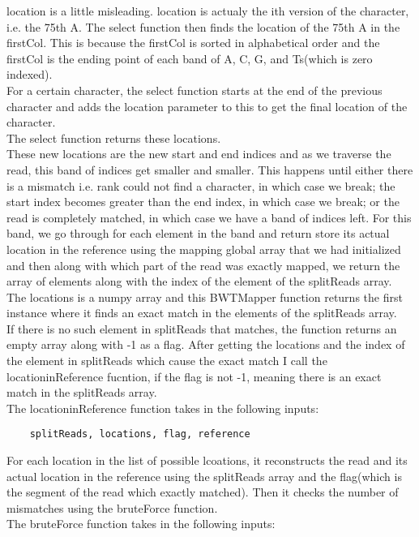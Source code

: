 \documentclass[12pt]{article}
\begin{document}
location is a little misleading. location is actualy the ith version of the character, i.e. the 75th A. The select function then finds the location of the 75th A in the firstCol. This is because the firstCol is sorted in alphabetical order and the firstCol is the ending point of each band of A, C, G, and Ts(which is zero indexed).\\
For a certain character, the select function starts at the end of the previous character and adds the location parameter to this to get the final location of the character.\\
The select function returns these locations.\\
These new locations are the new start and end indices and as we traverse the read, this band of indices get smaller and smaller. This happens until either there is a mismatch i.e. rank could not find a character, in which case we break; the start index becomes greater than the end index, in which case we break; or the read is completely matched, in which case we have a band of indices left. For this band, we go through for each element in the band and return store its actual location in the reference using the mapping global array that we had initialized and then along with which part of the read was exactly mapped, we return the array of elements along with the index of the element of the splitReads array.\\
The locations is a numpy array and this BWTMapper function returns the first instance where it finds an exact match in the elements of the splitReads array.\\
If there is no such element in splitReads that matches, the function returns an empty array along with -1 as a flag.
After getting the locations and the index of the element in splitReads which cause the exact match I call the locationinReference fucntion, if the flag is not -1, meaning there is an exact match in the splitReads array.\\
The locationinReference function takes in the following inputs:
\begin{verbatim}
    splitReads, locations, flag, reference
\end{verbatim}
For each location in the list of possible lcoations, it reconstructs the read and its actual location in the reference using the splitReads array and the flag(which is the segment of the read which exactly matched). Then it checks the number of mismatches using the bruteForce function.\\
The bruteForce function takes in the following inputs:
\end{document}
